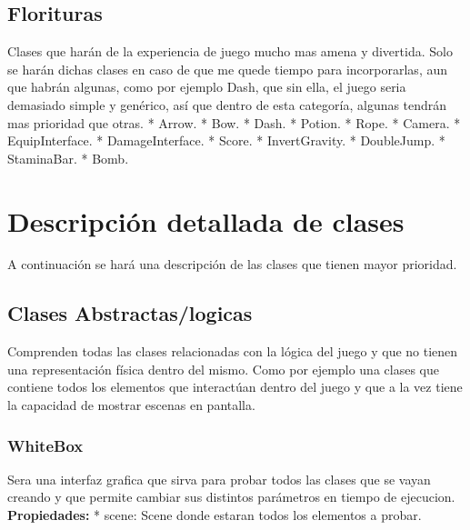 \documentclass{article}
\begin{document}
\subsection{Florituras}
Clases que harán de la experiencia de juego mucho mas amena y divertida. Solo se harán dichas clases en caso de que me quede tiempo para incorporarlas, aun que habrán algunas, como por ejemplo Dash, que sin ella, el juego seria demasiado simple y genérico, así que dentro de esta categoría, algunas tendrán mas prioridad que otras.
\subitem
* Arrow.\newline
* Bow.\newline
* Dash.\newline
* Potion.\newline
* Rope.\newline
* Camera. \newline
* EquipInterface. \newline
* DamageInterface. \newline
* Score. \newline
* InvertGravity. \newline
* DoubleJump. \newline
* StaminaBar. \newline
* Bomb. \newline

\section{Descripción detallada de clases} \label{contenido}
A continuación se hará una descripción de las clases que tienen mayor prioridad.\newline

\subsection{Clases Abstractas/logicas}
Comprenden todas las clases relacionadas con la lógica del juego y que no tienen una representación física dentro del mismo. Como por ejemplo una clases que contiene todos los elementos que interactúan dentro del juego y que a la vez tiene la capacidad de mostrar escenas en pantalla. \newline

\subsubsection*{WhiteBox} 
Sera una interfaz grafica que sirva para probar todos las clases que se vayan creando y que permite cambiar sus distintos parámetros en tiempo de ejecucion.\newline 
\subitem \textbf{Propiedades:} \newline
* scene: Scene donde estaran todos los elementos a probar.\newline
\end{document}
